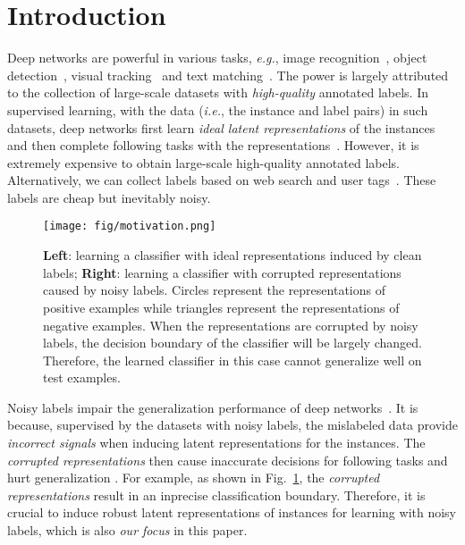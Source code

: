 \documentclass[10pt,twocolumn,letterpaper]{article}
\begin{document}
\section{Introduction}
Deep networks are powerful in various tasks, \textit{e.g.}, image recognition~\cite{he2016deep,Zhang2021TCSVT}, object detection~\cite{yang2022objects}, visual tracking~\cite{GeZL0T21} and text matching~\cite{ChenHNLLWX18}. The power is largely attributed to the collection of large-scale datasets with \textit{high-quality} annotated labels. In supervised learning, with the data (\textit{i.e.}, the instance and label pairs) in such datasets, deep networks first learn \textit{ideal latent representations} of the instances and then complete following tasks with the representations~\cite{goodfellow2016deep,yang2021free}. However, it is extremely expensive to obtain large-scale high-quality annotated labels. Alternatively, we can collect labels based
on web search and user tags~\cite{xiao2015learning,Li2017iccv}. These labels are cheap but inevitably noisy. 
\begin{figure}[!t]
    \centering
    \texttt{[image: fig/motivation.png]}
    \caption{\textbf{Left}: learning a classifier with ideal representations induced by clean labels; \textbf{Right}: learning a classifier with corrupted representations caused by noisy labels. Circles represent the  representations of positive examples while triangles represent the representations of negative examples. When the representations are corrupted by noisy labels, the decision boundary of the classifier will be largely changed. Therefore, the learned classifier in this case cannot generalize well on test examples.}
    \vspace{-12pt}
    \label{fig:motivation}
\end{figure}

Noisy labels impair the generalization performance of deep networks~\cite{Zhang2017iclr,han2020sigua}. It is because, supervised by the datasets with noisy labels, the mislabeled data provide \textit{incorrect signals} when inducing latent representations for the instances. The \textit{corrupted representations} then cause inaccurate decisions for following tasks and hurt generalization \cite{lee2019robust,xia2021robust}. For example, as shown in Fig.~\ref{fig:motivation}, the \textit{corrupted representations} result in an inprecise classification boundary. Therefore, it is crucial to induce robust latent  representations of instances for learning with noisy labels, which is also \textit{our focus} in this paper.  
\end{document}
